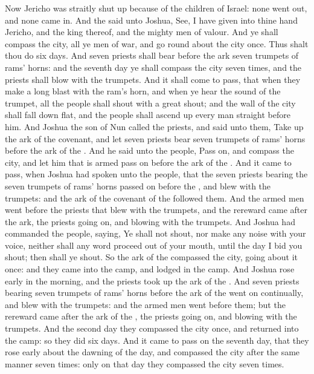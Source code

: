 \begin{biblechapter} %
\verse Now Jericho was straitly shut up because of the children of Israel: none went out, and none came in.
\verse And the \LORD said unto Joshua, See, I have given into thine hand Jericho, and the king thereof, and the mighty men of valour.
\verse And ye shall compass the city, all ye men of war, and go round about the city once. Thus shalt thou do six days.
\verse And seven priests shall bear before the ark seven trumpets of rams' horns: and the seventh day ye shall compass the city seven times, and the priests shall blow with the trumpets.
\verse And it shall come to pass, that when they make a long blast with the ram's horn, and when ye hear the sound of the trumpet, all the people shall shout with a great shout; and the wall of the city shall fall down flat, and the people shall ascend up every man straight before him.
\verse And Joshua the son of Nun called the priests, and said unto them, Take up the ark of the covenant, and let seven priests bear seven trumpets of rams' horns before the ark of the \LORD.
\verse And he said unto the people, Pass on, and compass the city, and let him that is armed pass on before the ark of the \LORD.
\verse And it came to pass, when Joshua had spoken unto the people, that the seven priests bearing the seven trumpets of rams' horns passed on before the \LORD, and blew with the trumpets: and the ark of the covenant of the \LORD followed them.
\verse And the armed men went before the priests that blew with the trumpets, and the rereward came after the ark, the priests going on, and blowing with the trumpets.
\verse And Joshua had commanded the people, saying, Ye shall not shout, nor make any noise with your voice, neither shall any word proceed out of your mouth, until the day I bid you shout; then shall ye shout.
\verse So the ark of the \LORD compassed the city, going about it once: and they came into the camp, and lodged in the camp.
\verse And Joshua rose early in the morning, and the priests took up the ark of the \LORD.
\verse And seven priests bearing seven trumpets of rams' horns before the ark of the \LORD went on continually, and blew with the trumpets: and the armed men went before them; but the rereward came after the ark of the \LORD, the priests going on, and blowing with the trumpets.
\verse And the second day they compassed the city once, and returned into the camp: so they did six days.
\verse And it came to pass on the seventh day, that they rose early about the dawning of the day, and compassed the city after the same manner seven times: only on that day they compassed the city seven times.

\end{biblechapter}
